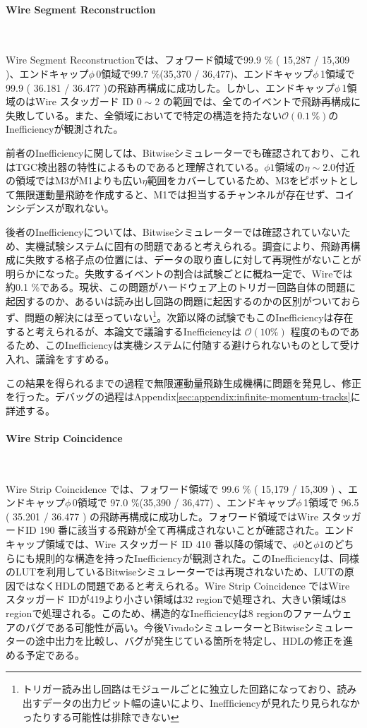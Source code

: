 \paragraph{Wire Segment Reconstruction}　　
\par
Wire Segment Reconstructionでは、フォワード領域で99.9 \% ( 15,287 / 15,309 )、エンドキャップ$\phi\,$0領域で99.7 \%(35,370 / 36,477)、エンドキャップ$\phi\,$1領域で99.9 ( 36.181 / 36.477 )の飛跡再構成に成功した。しかし、エンドキャップ$\phi\,$1領域のはWire スタッガード ID $0 \sim 2$ の範囲では、全てのイベントで飛跡再構成に失敗している。また、全領域においてで特定の構造を持たない$\mathcal{O}(0.1\,\%)$のInefficiencyが観測された。

前者のInefficiencyに関しては、Bitwiseシミュレーターでも確認されており、これはTGC検出器の特性によるものであると理解されている。$\phi1$領域の$\eta\sim$2.0付近の領域ではM3がM1よりも広い$\eta$範囲をカバーしているため、M3をピボットとして無限運動量飛跡を作成すると、M1では担当するチャンネルが存在せず、コインシデンスが取れない。

後者のInefficiencyについては、Bitwiseシミュレーターでは確認されていないため、実機試験システムに固有の問題であると考えられる。調査により、飛跡再構成に失敗する格子点の位置には、データの取り直しに対して再現性がないことが明らかになった。失敗するイベントの割合は試験ごとに概ね一定で、Wireでは約0.1 \%である。現状、この問題がハードウェア上のトリガー回路自体の問題に起因するのか、あるいは読み出し回路の問題に起因するのかの区別がついておらず、問題の解決には至っていない\footnote{トリガー読み出し回路はモジュールごとに独立した回路になっており、読み出すデータの出力ビット幅の違いにより、Ineffficiencyが見れたり見られなかったりする可能性は排除できない}。次節以降の試験でもこのInefficiencyは存在すると考えられるが、本論文で議論するInefficiencyは $\mathcal{O}(10 \%)$ 程度のものであるため、このInefficiencyは実機システムに付随する避けられないものとして受け入れ、議論をすすめる。

この結果を得られるまでの過程で無限運動量飛跡生成機構に問題を発見し、修正を行った。デバッグの過程はAppendix\ref{sec:appendix:infinite-momentum-tracks}に詳述する。


\paragraph{Wire Strip Coincidence}　　
\par
Wire Strip Coincidence では、フォワード領域で 99.6 \% ( 15,179 / 15,309 ) 、エンドキャップ$\phi\,$0領域で 97.0 \%(35,390 / 36,477) 、エンドキャップ$\phi\,$1領域で 96.5 ( 35.201 / 36.477 ) の飛跡再構成に成功した。フォワード領域ではWire スタッガードID 190 番に該当する飛跡が全て再構成されないことが確認された。エンドキャップ領域では、Wire スタッガード ID 410 番以降の領域で、$\phi0$と$\phi1$のどちらにも規則的な構造を持ったInefficiencyが観測された。このInefficiencyは、同様のLUTを利用しているBitwiseシミュレーターでは再現されないため、LUTの原因ではなくHDLの問題であると考えられる。Wire Strip Coincidence ではWire スタッガード IDが419より小さい領域は32 regionで処理され、大きい領域は8 regionで処理される。このため、構造的なInefficiencyは8 regionのファームウェアのバグである可能性が高い。今後VivadoシミュレーターとBitwiseシミュレーターの途中出力を比較し、バグが発生じている箇所を特定し、HDLの修正を進める予定である。

